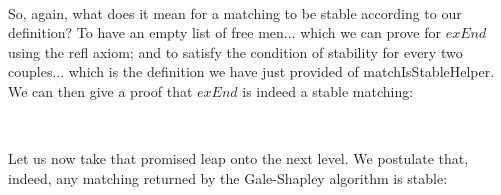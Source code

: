 {\begin{code}
\>[.][@{}l@{}]\<[3250I]%
\>[24]\AgdaSymbol{(}\AgdaSpace{}%
\AgdaSymbol{(}\AgdaSpace{}%
\AgdaSymbol{(}\AgdaSpace{}%
\AgdaSymbol{())))}\<%
\\
\>[0]\AgdaSpace{}%
\AgdaSymbol{\AgdaUnderscore{}}\AgdaSpace{}%
\AgdaSymbol{\AgdaUnderscore{}}\AgdaSpace{}%
\AgdaSymbol{(}\AgdaSpace{}%
\AgdaSymbol{(}\AgdaSpace{}%
\AgdaSymbol{(}\AgdaSpace{}%
\AgdaSymbol{())))}\AgdaSpace{}%
\AgdaSymbol{\AgdaUnderscore{}}\AgdaSpace{}%
\AgdaSymbol{\AgdaUnderscore{}}\<%
\end{code}

So, again, what does it mean for a matching to be stable according to our definition? To have an empty list of free men... which we can prove for $exEnd$ using the refl axiom; and to satisfy the condition of stability for every two couples... which is the definition we have just provided of matchIsStableHelper. We can then give a proof that $exEnd$ is indeed a stable matching: 

\begin{code}%
\>[0]\AgdaSpace{}%
\AgdaSymbol{:}\AgdaSpace{}%
\AgdaSpace{}%
\<%
\\
\>[0]\AgdaSpace{}%
\AgdaSymbol{=}\AgdaSpace{}%
\AgdaSpace{}%
\AgdaOperator{\AgdaInductiveConstructor{,}}\AgdaSpace{}%
\<%
\end{code}

Let us now take that promised leap onto the next level. We postulate that, indeed, any matching returned by the Gale-Shapley algorithm is stable:

\begin{code}%
\>[0]\<%
\\
\>[0][@{}l@{\AgdaIndent{0}}]%
\>[2]\AgdaSpace{}%
\AgdaSymbol{:}\AgdaSpace{}%
\AgdaSpace{}%
\AgdaSymbol{(}\AgdaSpace{}%
\AgdaSpace{}%
\AgdaSymbol{:}\AgdaSpace{}%
\AgdaSymbol{)}\AgdaSpace{}%
\AgdaSpace{}%
\AgdaSpace{}%
\AgdaSpace{}%
\AgdaSpace{}%
\AgdaSpace{}%
\<%
\\
\>[2][@{}l@{\AgdaIndent{0}}]%
\>[19]\AgdaSpace{}%
\<%
\end{code}

}
